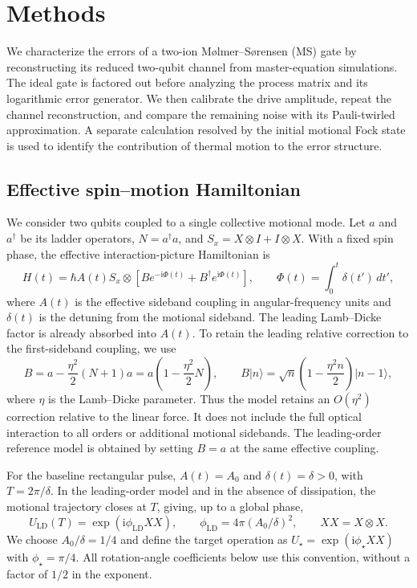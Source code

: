 \documentclass[a4paper,11pt]{article}
\newcommand{\ii}{\mathrm{i}}
\newcommand{\ket}[1]{\lvert #1\rangle}
\begin{document}
\section{Methods}
\label{sec:methods}

We characterize the errors of a two-ion M{\o}lmer--S{\o}rensen (MS) gate
by reconstructing its reduced two-qubit channel from master-equation
simulations. The ideal gate is factored out before analyzing the process
matrix and its logarithmic error generator. We then calibrate the drive
amplitude, repeat the channel reconstruction, and compare the remaining
noise with its Pauli-twirled approximation. A separate calculation resolved
by the initial motional Fock state is used to identify the contribution of
thermal motion to the error structure.

\subsection{Effective spin--motion Hamiltonian}
\label{subsec:hamiltonian}

We consider two qubits coupled to a single collective motional mode.
Let $a$ and $a^\dagger$ be its ladder operators, $N=a^\dagger a$, and
$S_x=X\otimes I+I\otimes X$. With a fixed spin phase, the effective
interaction-picture Hamiltonian is
\begin{equation}
 H(t)=\hbar A(t)S_x\otimes
 \left[B e^{-\ii\Phi(t)}+B^\dagger e^{\ii\Phi(t)}\right],
 \qquad \Phi(t)=\int_0^t\delta(t')\,dt',
 \label{eq:methods_hamiltonian}
\end{equation}
where $A(t)$ is the effective sideband coupling in angular-frequency units
and $\delta(t)$ is the detuning from the motional sideband. The leading
Lamb--Dicke factor is already absorbed into $A(t)$. To retain the leading
relative correction to the first-sideband coupling, we use
\begin{equation}
 B=a-\frac{\eta^2}{2}(N+1)a
   =a\left(1-\frac{\eta^2}{2}N\right),
 \qquad
 B\ket{n}=\sqrt n\left(1-\frac{\eta^2 n}{2}\right)\ket{n-1},
 \label{eq:methods_B}
\end{equation}
where $\eta$ is the Lamb--Dicke parameter. Thus the model retains an
$O(\eta^2)$ correction relative to the linear force. It does not include
the full optical interaction to all orders or additional motional
sidebands. The leading-order reference model is obtained by setting
$B=a$ at the same effective coupling.

For the baseline rectangular pulse, $A(t)=A_0$ and $\delta(t)=\delta>0$,
with $T=2\pi/\delta$. In the leading-order model and in the absence of
dissipation, the motional trajectory closes at $T$, giving, up to a global
phase,
\begin{equation}
 U_{\mathrm{LD}}(T)=\exp(\ii\phi_{\mathrm{LD}}XX),
 \qquad \phi_{\mathrm{LD}}=4\pi(A_0/\delta)^2,
 \qquad XX=X\otimes X.
\end{equation}
We choose $A_0/\delta=1/4$ and define the target operation as
$U_\star=\exp(\ii\phi_\star XX)$ with $\phi_\star=\pi/4$.
All rotation-angle coefficients below use this convention, without a
factor of $1/2$ in the exponent.
\end{document}
